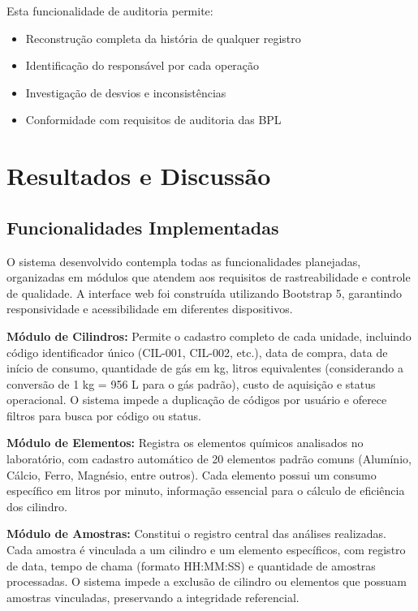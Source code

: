 \documentclass[12pt,a4paper]{article}
\begin{document}
Esta funcionalidade de auditoria permite:
\begin{itemize}
\item Reconstrução completa da história de qualquer registro
\item Identificação do responsável por cada operação
\item Investigação de desvios e inconsistências
\item Conformidade com requisitos de auditoria das BPL
\end{itemize}

\section{Resultados e Discussão}

\subsection{Funcionalidades Implementadas}

O sistema desenvolvido contempla todas as funcionalidades planejadas, organizadas em módulos que atendem aos requisitos de rastreabilidade e controle de qualidade. A interface web foi construída utilizando Bootstrap 5, garantindo responsividade e acessibilidade em diferentes dispositivos.

\textbf{Módulo de Cilindros:} Permite o cadastro completo de cada unidade, incluindo código identificador único (CIL-001, CIL-002, etc.), data de compra, data de início de consumo, quantidade de gás em kg, litros equivalentes (considerando a conversão de 1 kg = 956 L para o gás padrão), custo de aquisição e status operacional. O sistema impede a duplicação de códigos por usuário e oferece filtros para busca por código ou status.

\textbf{Módulo de Elementos:} Registra os elementos químicos analisados no laboratório, com cadastro automático de 20 elementos padrão comuns (Alumínio, Cálcio, Ferro, Magnésio, entre outros). Cada elemento possui um consumo específico em litros por minuto, informação essencial para o cálculo de eficiência dos cilindro.

\textbf{Módulo de Amostras:} Constitui o registro central das análises realizadas. Cada amostra é vinculada a um cilindro e um elemento específicos, com registro de data, tempo de chama (formato HH:MM:SS) e quantidade de amostras processadas. O sistema impede a exclusão de cilindro ou elementos que possuam amostras vinculadas, preservando a integridade referencial.
\end{document}

